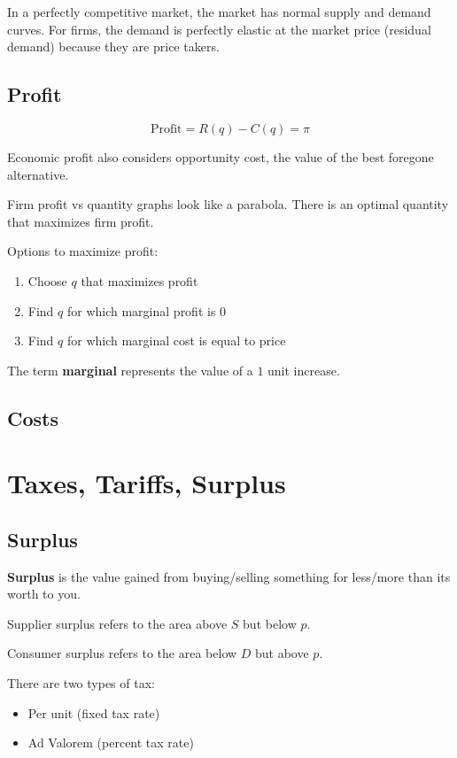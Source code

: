 In a perfectly competitive market, the market has normal supply and demand curves. For firms, the demand is perfectly elastic at the market price (residual demand) because they are price takers.

\subsection{Profit}
\[\text{Profit} = R(q)-C(q) = \pi\]

Economic profit also considers opportunity cost, the value of the best foregone alternative.

Firm profit vs quantity graphs look like a parabola. There is an optimal quantity that maximizes firm profit.

Options to maximize profit:

\begin{enumerate}
  \item Choose $q$ that maximizes profit
  \item Find $q$ for which marginal profit is $0$
  \item Find $q$ for which marginal cost is equal to price
\end{enumerate}

\begin{definition}
  The term \textbf{marginal} represents the value of a $1$ unit increase.
\end{definition}

\subsection{Costs}

\section{Taxes, Tariffs, Surplus}

\subsection{Surplus}

\begin{definition}
  \textbf{Surplus} is the value gained from buying/selling something for less/more than its worth to you.
\end{definition}

Supplier surplus refers to the area above $S$ but below $p$.

Consumer surplus refers to the area below $D$ but above $p$.

There are two types of tax:
\begin{itemize}
  \item Per unit (fixed tax rate)
  \item Ad Valorem (percent tax rate)
\end{itemize}
